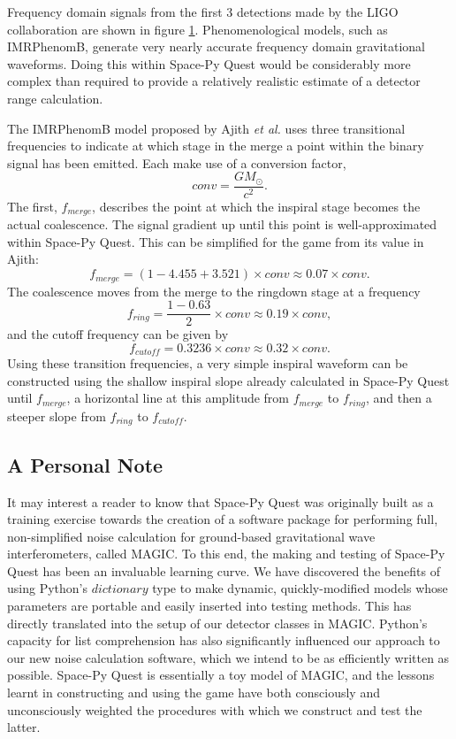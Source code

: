 \documentclass{article}
\begin{document}
\begin{enumerate}
\begin{figure}
    \label{fig:fdomsig}
    \end{figure}
Frequency domain signals from the first 3 detections made by the LIGO collaboration are shown in figure \ref{fig:fdomsig}. Phenomenological models, such as IMRPhenomB, generate very nearly accurate frequency domain gravitational waveforms. Doing this within Space-Py Quest would be considerably more complex than required to provide a relatively realistic estimate of a detector range calculation.
\par
The IMRPhenomB model proposed by Ajith \textit{et al.} \cite{ajith} uses three transitional frequencies to indicate at which stage in the merge a point within the binary signal has been emitted. Each make use of a conversion factor,
\[
conv = \frac{GM_{\odot}}{c^2}.
\]
The first, $f_{merge}$, describes the point at which the inspiral stage becomes the actual coalescence. The signal gradient up until this point is well-approximated within Space-Py Quest. This can be simplified for the game from its value in Ajith:
\[
f_{merge} = (1 - 4.455 + 3.521) \times conv \approx 0.07 \times conv .
\]
The coalescence moves from the merge to the ringdown stage at a frequency
\[
f_{ring} = \frac{1 - 0.63}{2} \times conv \approx 0.19 \times conv,
\]
and the cutoff frequency can be given by
\[
f_{cutoff} = 0.3236 \times conv \approx 0.32 \times conv.
\]
Using these transition frequencies, a very simple inspiral waveform can be constructed using the shallow inspiral slope already calculated in Space-Py Quest until $f_{merge}$, a horizontal line at this amplitude from $f_{merge}$ to $f_{ring}$, and then a steeper slope from $f_{ring}$ to $f_{cutoff}$. 
\end{enumerate}
\subsection{A Personal Note}
It may interest a reader to know that Space-Py Quest was originally built as a training exercise towards the creation of a software package for performing full, non-simplified noise calculation for ground-based gravitational wave interferometers, called MAGIC. To this end, the making and testing of Space-Py Quest has been an invaluable learning curve. We have discovered the benefits of using Python's $dictionary$ type to make dynamic, quickly-modified models whose parameters are portable and easily inserted into testing methods. This has directly translated into the setup of our detector classes in MAGIC. Python's capacity for list comprehension has also significantly influenced our approach to our new noise calculation software, which we intend to be as efficiently written as possible. Space-Py Quest is essentially a toy model of MAGIC, and the lessons learnt in constructing and using the game have both consciously and unconsciously weighted the procedures with which we construct and test the latter.
\end{document}
